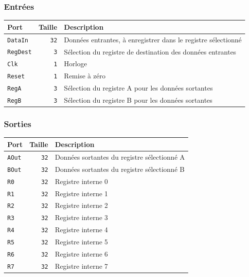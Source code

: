 \subsubsection{Entrées}

\begin{tabular}{|l|r|l|}
\hline
\textbf{Port}		& \textbf{Taille} & \textbf{Description}\\
\hline

\texttt{DataIn}		& \texttt{32} & Données entrantes, à enregistrer dans le registre sélectionné\\
\hline
\texttt{RegDest}	&  \texttt{3} & Sélection du registre de destination des données entrantes\\
\hline
\texttt{Clk}		&  \texttt{1} & Horloge\\
\hline
\texttt{Reset}		&  \texttt{1} & Remise à zéro\\
\hline
\texttt{RegA}		&  \texttt{3} & Sélection du registre A pour les données sortantes\\
\hline
\texttt{RegB}		&  \texttt{3} & Sélection du registre B pour les données sortantes\\

\hline
\end{tabular}


\subsubsection{Sorties}

\begin{tabular}{|l|r|l|}
\hline 
\textbf{Port} & \textbf{Taille} & \textbf{Description}\\
\hline

\texttt{AOut}	& \texttt{32} & Données sortantes du registre sélectionné A\\
\hline
\texttt{BOut}	& \texttt{32} & Données sortantes du registre sélectionné B\\
\hline
\texttt{R0}	& \texttt{32} & Registre interne 0\\
\hline
\texttt{R1}	& \texttt{32} & Registre interne 1\\
\hline
\texttt{R2}	& \texttt{32} & Registre interne 2\\
\hline
\texttt{R3}	& \texttt{32} & Registre interne 3\\
\hline
\texttt{R4}	& \texttt{32} & Registre interne 4\\
\hline
\texttt{R5}	& \texttt{32} & Registre interne 5\\
\hline
\texttt{R6}	& \texttt{32} & Registre interne 6\\
\hline
\texttt{R7}	& \texttt{32} & Registre interne 7\\

\hline
\end{tabular}

